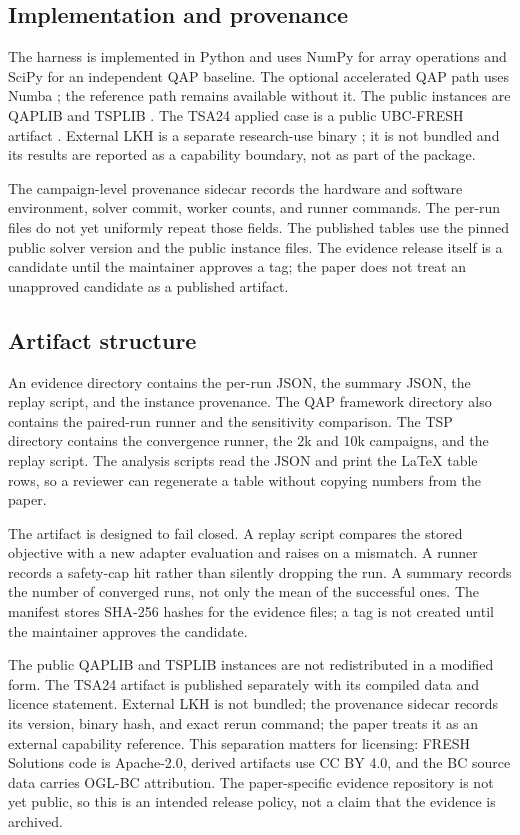 \documentclass[pdflatex,sn-mathphys-num]{sn-jnl}
\begin{document}
\subsection{Implementation and provenance}

The harness is implemented in Python \citep{freshsolutions} and uses NumPy \citep{harris2020} for array operations and SciPy
\citep{virtanen2020} for an independent QAP baseline. The optional accelerated QAP path uses Numba
\citep{lam2015}; the reference path remains available without it. The public instances are QAPLIB
\citep{burkard1997} and TSPLIB \citep{reinelt1991}. The TSA24 applied case is a public UBC-FRESH
artifact \citep{tsa24artifact}. External LKH is a separate research-use binary \citep{lkh3}; it is not
bundled and its results are reported as a capability boundary, not as part of the package.

The campaign-level provenance sidecar records the hardware and software environment, solver commit,
worker counts, and runner commands. The per-run files do not yet uniformly repeat those fields. The
published tables use the pinned public solver version and the public instance files. The evidence release itself is a
candidate until the maintainer approves a tag; the paper does not treat an unapproved candidate as a
published artifact.

\subsection{Artifact structure}

An evidence directory contains the per-run JSON, the summary JSON, the replay script, and the
instance provenance. The QAP framework directory also contains the paired-run runner and the
sensitivity comparison. The TSP directory contains the convergence runner, the 2k and 10k campaigns,
and the replay script. The analysis scripts read the JSON and print the LaTeX table rows, so a
reviewer can regenerate a table without copying numbers from the paper.

The artifact is designed to fail closed. A replay script compares the stored objective with a new
adapter evaluation and raises on a mismatch. A runner records a safety-cap hit rather than silently
dropping the run. A summary records the number of converged runs, not only the mean of the successful
ones. The manifest stores SHA-256 hashes for the evidence files; a tag is not created until the
maintainer approves the candidate.

The public QAPLIB and TSPLIB instances are not redistributed in a modified form. The TSA24 artifact is
published separately with its compiled data and licence statement. External LKH is not bundled; the
provenance sidecar records its version, binary hash, and exact rerun command; the paper treats it as
an external capability reference. This separation matters for licensing: FRESH Solutions code is Apache-2.0, derived artifacts use
CC BY 4.0, and the BC source data carries OGL-BC attribution. The paper-specific evidence repository
is not yet public, so this is an intended release policy, not a claim that the evidence is archived.
\end{document}
